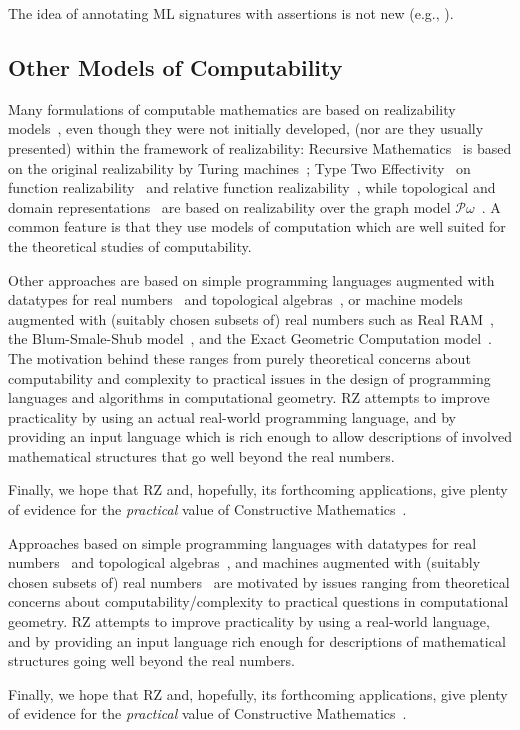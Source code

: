 The idea of annotating ML signatures with assertions is not new (e.g., \cite{kahrs+:tcs97}).
 
\subsection{Other Models of Computability}
\label{sec:models-of-computability}

Many formulations of computable mathematics are based on realizability
models~\cite{Bauer:00}, even though they were not initially developed,
(nor are they usually presented) within the framework of realizability:
Recursive Mathematics~\cite{ershov98:_handb_recur_mathem} is based on
the original realizability by Turing machines~\cite{KleeneSC:intint};
Type Two Effectivity~\cite{Wei00} on function
realizability~\cite{KleeneSC:fouim} and relative function
realizability~\cite{BirkedalL:devttc}, while topological and domain
representations~\cite{Bla97a,Bauer:Birkedal:Scott:98} are based on
realizability over the graph model
$\mathcal{P}\omega$~\cite{ScottD:dattl}. A common feature is
that they use models of computation which are well suited for the
theoretical studies of computability. 

\iflong
Other approaches are based on simple programming languages augmented with
datatypes for real numbers~\cite{escardo97:_pcf,marcial-romero04:_seman}
and topological algebras~\cite{TZ98}, or machine models augmented with
(suitably chosen subsets of) real numbers such as Real
RAM~\cite{borodin75}, the Blum-Smale-Shub
model~\cite{blum98:_compl_real_comput}, and the Exact Geometric
Computation model~\cite{yap06:_theor_real_comput_egc}. The motivation
behind these ranges from purely theoretical concerns about
computability and complexity to practical issues in the design of
programming languages and algorithms in computational geometry. RZ
attempts to improve practicality by using an actual
real-world programming language, and by providing an input language
which is rich enough to allow descriptions of involved mathematical
structures that go well beyond the real numbers.

Finally, we hope that RZ and, hopefully, its forthcoming applications,
give plenty of evidence for the \emph{practical} value of Constructive
Mathematics~\cite{Bishop:Bridges:85}.

\else %

Approaches based on simple programming languages with datatypes for
real numbers~\cite{escardo97:_pcf,marcial-romero04:_seman} and topological
algebras~\cite{TZ98}, and machines augmented with (suitably chosen
subsets of) real
numbers~\cite{borodin75,blum98:_compl_real_comput,yap06:_theor_real_comput_egc}
are motivated by issues ranging from theoretical concerns about
computability/complexity to practical questions in computational
geometry. RZ attempts to improve practicality by using a
real-world language, and by providing an input language
rich enough for descriptions of mathematical
structures going well beyond the real numbers.

Finally, we hope that RZ and, hopefully, its forthcoming applications,
give plenty of evidence for the \emph{practical} value of Constructive
Mathematics~\cite{Bishop:Bridges:85}.

\fi




